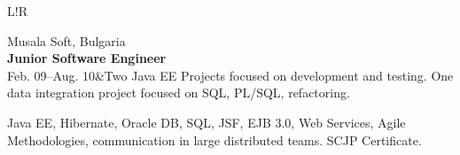 \documentclass[11pt]{article}
\newcommand\VRule{\color{lightgray}\vrule width 0.5pt}
\begin{document}
\begin{tabular}{L!{\VRule}R}

Musala Soft, Bulgaria\\
{\bf Junior Software Engineer}\\
Feb. 09--Aug. 10&Two Java EE Projects focused on development and testing. One
data integration project focused on SQL, PL/SQL, refactoring.

Java EE, Hibernate, Oracle DB, SQL, JSF, EJB 3.0, Web
Services, Agile Methodologies, communication in large distributed teams. SCJP Certificate.


\end{tabular}

% 
\end{document}
